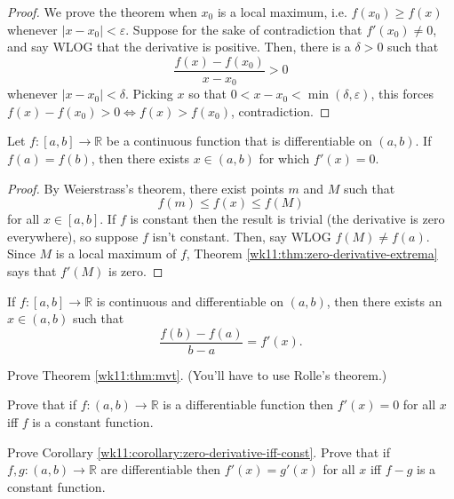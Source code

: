 \documentclass[10pt]{scrartcl}
\providecommand{\eps}{\varepsilon}
\providecommand{\RR}{\mathbb R}
\begin{document}
\begin{proof}
	We prove the theorem when $x_0$ is a local maximum,
	i.e. $f(x_0) \ge f(x)$ whenever $|x - x_0| < \eps$.
	Suppose for the sake of contradiction that $f'(x_0) \ne 0$,
	and say WLOG that the derivative is positive.
	Then, there is a $\delta> 0$ such that
	\[\frac{f(x) - f(x_0)}{x - x_0} > 0\]
	whenever $|x - x_0| < \delta$.
	Picking $x$ so that $0 < x - x_0 < \min(\delta, \eps)$,
	this forces $f(x) - f(x_0) > 0 \iff f(x) > f(x_0)$,
	contradiction.
\end{proof}

\begin{theorem}\label{wk11:thm:rolle}
	Let $f\colon[a,b]\to\RR$ be a continuous function
	that is differentiable on $(a,b)$.
	If $f(a) = f(b)$, then there exists $x\in(a, b)$
	for which $f'(x) = 0$.
\end{theorem}

\begin{proof}
	By Weierstrass's theorem, there exist points $m$ and $M$ such that
	\[f(m) \le f(x) \le f(M)\]
	for all $x\in[a,b]$. If $f$ is constant then the result is trivial
	(the derivative is zero everywhere), so suppose $f$ isn't constant.
	Then, say WLOG $f(M)\ne f(a)$. Since $M$ is a local maximum of $f$,
	Theorem \ref{wk11:thm:zero-derivative-extrema} says that $f'(M)$ is zero.
\end{proof}

\begin{theorem}\label{wk11:thm:mvt}
	If $f\colon[a,b]\to\RR$ is continuous
	and differentiable on $(a,b)$, then there exists an $x\in(a, b)$ such that
	\[\frac{f(b) - f(a)}{b - a} = f'(x).\]
\end{theorem}

\begin{exercise}
	Prove Theorem \ref{wk11:thm:mvt}. (You'll have to use Rolle's theorem.)
\end{exercise}

\begin{corollary}\label{wk11:corollary:zero-derivative-iff-const}
	Prove that if $f\colon (a, b)\to\RR$ is a differentiable function
	then $f'(x) = 0$ for all $x$ iff $f$ is a constant function.
\end{corollary}

\begin{exercise}
	Prove Corollary \ref{wk11:corollary:zero-derivative-iff-const}.
	Prove that if $f,g\colon(a, b)\to\RR$ are differentiable then
	$f'(x) = g'(x)$ for all $x$ iff $f - g$ is a constant function.
\end{exercise}
\end{document}
